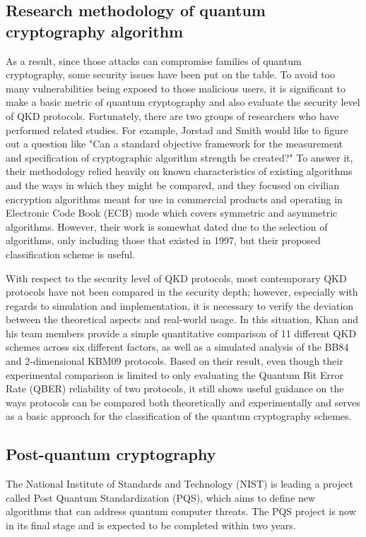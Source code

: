 \documentclass[sigconf]{acmart}
\begin{document}
\subsection{Research methodology of quantum cryptography algorithm}
As a result, since those attacks can compromise families of quantum cryptography, some security issues have been put on the table.  To avoid too many vulnerabilities being exposed to those malicious users, it is significant to make a basic metric of quantum cryptography and also evaluate the security level of QKD protocols. Fortunately, there are two groups of researchers who have performed related studies. For example, Jorstad and Smith\cite{jorstad_cryptographic_1997} would like to figure out a question like "Can a standard objective framework for the measurement and specification of cryptographic algorithm strength be created?" To answer it, their methodology relied heavily on known characteristics of existing algorithms and the ways in which they might be compared, 
and they focused on civilian encryption algorithms meant for use in commercial products and operating in Electronic Code Book (ECB) mode which covers symmetric and asymmetric algorithms. However, their work is somewhat dated due to the selection of algorithms, only including those that existed in 1997, but their proposed classification scheme is useful.

With respect to the security level of QKD protocols, most contemporary QKD protocols have not been compared in the security depth; however, especially with regards to simulation and implementation, it is necessary to verify the deviation between the theoretical aspects and real-world usage. In this situation, Khan and his team members provide a simple quantitative comparison of 11 different QKD schemes across six different factors, as well as a simulated analysis of the BB84 and 2-dimensional KBM09 protocols\cite{khan_security_2020}. Based on their result, even though their experimental comparison is limited to only evaluating the Quantum Bit Error Rate (QBER) reliability of two protocols, it still shows useful guidance on the ways protocols can be compared both theoretically and experimentally and serves as a basic approach for the classification of the quantum cryptography schemes.

\subsection{Post-quantum cryptography}
The National Institute of Standards and Technology (NIST) is leading a project called Post Quantum Standardization (PQS), which aims to define new algorithms that can address quantum computer threats. The PQS project is now in its final stage and is expected to be completed within two years\cite{moody_nist_2020}.
\end{document}
